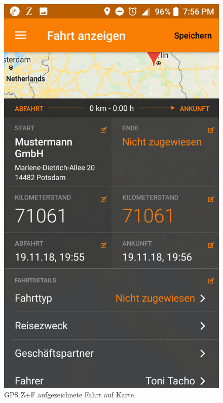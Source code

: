 \documentclass[a4paper]{article}
\begin{document}
\begin{figure}[H]
\begin{minipage}[b]{.4\linewidth}
        \includegraphics[scale=0.14]{img/pro4}
        \caption{\label{img:img/pro4}GPS Z+F aufgezeichnete Fahrt auf Karte.}
    \end{minipage}
\end{figure}
\end{document}
